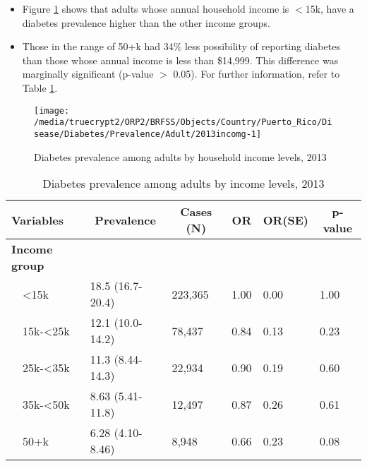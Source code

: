  
 
 \newpage
\begin{itemize}

\item Figure \ref{fig:income.Diabetes.2013} shows that adults whose annual household income is 
$<$15k, have a diabetes prevalence higher than the other income groups.

\item Those in the range of 50+k had 34\% less possibility of reporting diabetes than those whose annual income is less than \$14,999. This difference was marginally significant (p-value $>$ 0.05).  For further information, refer to Table \ref{tab:income.Diabetes.2013}.

\end{itemize}

\begin{figure}[H]
\caption{Diabetes prevalence among adults by household income levels, 
         2013}
\begin{knitrout}
\color{fgcolor}

{\centering \texttt{[image: /media/truecrypt2/ORP2/BRFSS/Objects/Country/Puerto\_Rico/Disease/Diabetes/Prevalence/Adult/2013incomg-1]} 

}



\end{knitrout}
 \label{fig:income.Diabetes.2013}
\end{figure}

\begin{table}[H]
\caption{Diabetes prevalence  among adults by income levels, 2013\label{tab:income.Diabetes.2013}} 
\begin{center}
\begin{tabular}{llllll}
\hline\hline
\multicolumn{1}{l}{Variables}&\multicolumn{1}{c}{Prevalence}&\multicolumn{1}{c}{Cases (N)}&\multicolumn{1}{c}{OR}&\multicolumn{1}{c}{OR(SE)}&\multicolumn{1}{c}{p-value}\tabularnewline
\hline
{\bfseries Income group}&&&&&\tabularnewline
~~\textless15k&18.5 (16.7-20.4)&223,365&1.00&0.00&1.00\tabularnewline
~~15k-\textless25k&12.1 (10.0-14.2)& 78,437&0.84&0.13&0.23\tabularnewline
~~25k-\textless35k&11.3 (8.44-14.3)& 22,934&0.90&0.19&0.60\tabularnewline
~~35k-\textless50k&8.63 (5.41-11.8)& 12,497&0.87&0.26&0.61\tabularnewline
~~50+k&6.28 (4.10-8.46)&  8,948&0.66&0.23&0.08\tabularnewline
\hline
\end{tabular}\end{center}

\end{table}

